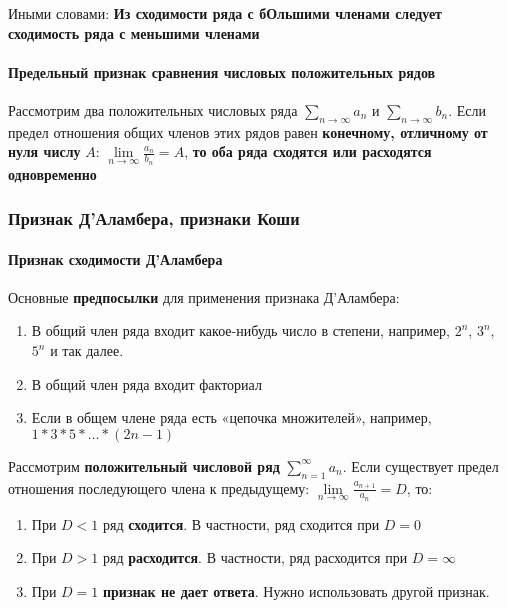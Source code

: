 \documentclass{article}
\begin{document}
\hfill

Иными словами: \textbf{Из сходимости ряда с бОльшими членами следует сходимость ряда с меньшими членами}

\paragraph{Предельный признак сравнения числовых положительных рядов}

Рассмотрим два положительных числовых ряда $\sum\limits_{n \to \infty} a_{n}$ и $\sum\limits_{n \to \infty} b_{n}$. Если предел отношения общих членов этих рядов равен \textbf{конечному, отличному от нуля числу} $A$: $\lim\limits_{n \to \infty} \frac{a_{n}}{b_{n}} = A$, \textbf{то оба ряда сходятся или расходятся одновременно}

\subsubsection{Признак Д'Аламбера, признаки Коши}

\paragraph{Признак сходимости Д'Аламбера}

Основные \textbf{предпосылки} для применения признака Д'Аламбера:

\begin{enumerate}
    \item В общий член ряда входит какое-нибудь число в степени, например, $2^{n}$, $3^{n}$, $5^{n}$ и так далее.
    \item В общий член ряда входит факториал
    \item Если в общем члене ряда есть «цепочка множителей», например, $1 * 3 * 5 * \dots * (2n - 1)$
\end{enumerate}

Рассмотрим \textbf{положительный числовой ряд} $\sum\limits_{n = 1}^{\infty} a_{n}$. Если существует предел отношения последующего члена к предыдущему: $\lim\limits_{n \to \infty} \frac{a_{n + 1}}{a_{n}} = D$, то:

\begin{enumerate}
    \item При $D < 1$ ряд \textbf{сходится}. В частности, ряд сходится при $D = 0$
    \item При $D > 1$ ряд \textbf{расходится}. В частности, ряд расходится при $D = \infty$
    \item При $D = 1$ \textbf{признак не дает ответа}. Нужно использовать другой признак.
\end{enumerate}
    
\end{document}
